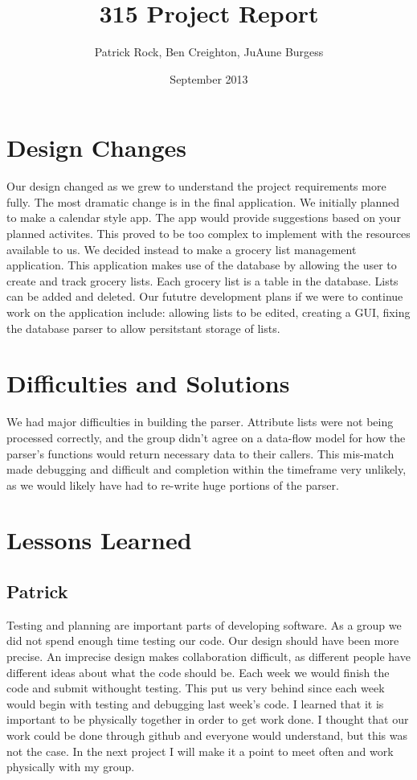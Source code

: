 \documentclass{article}
\title{315 Project Report}
\author{Patrick Rock, Ben Creighton, JuAune Burgess}
\date{September 2013}
\begin{document}
\maketitle

\section{Design Changes}
Our design changed as we grew to understand the project requirements more fully. The most dramatic change 
is in the final application. We initially planned to make a calendar style app. The app would provide suggestions
based on your planned activites. This proved to be too complex to implement with the resources available to us. 
We decided instead to make a grocery list management application. This application makes use of the database by 
allowing the user to create and track grocery lists. Each grocery list is a table in the database. Lists can 
be added and deleted. Our fututre development plans if we were to continue work on the application include:
allowing lists to be edited, creating a GUI, fixing the database parser to allow persitstant storage of lists. 

\section{Difficulties and Solutions}
We had major difficulties in building the parser.
Attribute lists were not being processed correctly, and the group didn’t agree on a data-flow model for how the
parser's functions would return necessary data to their callers. This mis-match made debugging and difficult and
completion within the timeframe very unlikely, as we would likely have had to re-write huge portions of the parser.

\section{Lessons Learned}
\subsection{Patrick} Testing and planning are important parts of developing software. As a group we did not spend enough
time testing our code. Our design should have been more precise. An imprecise design makes collaboration
difficult, as different people have different ideas about what the code should be. Each week we would 
finish the code and submit withought testing. This put us very behind since each week would begin with testing
and debugging last week's code. I learned that it is important to be physically together in order to get work 
done. I thought that our work could be done through github and everyone would understand, but this was not the case.
In the next project I will make it a point to meet often and work physically with my group.
\end{document}
